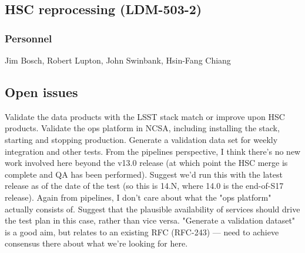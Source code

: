 \subsection{HSC reprocessing \textbf{(LDM-503-2)}\label{LDM-503-2}}
\subsubsection{Personnel}
Jim Bosch, Robert Lupton, John Swinbank, Hsin-Fang Chiang

\subsection{Open issues}
 Validate the data products with the LSST stack match or improve upon HSC products.
 Validate the ops platform in NCSA, including installing the stack, starting and stopping production.
 Generate a validation data set for weekly integration and other tests.
 \newline From the pipelines perspective, I think there's no new work involved here beyond the v13.0 release (at which point the HSC merge is complete and QA has been performed). Suggest we'd run this with the latest release as of the date of the test (so this is 14.N, where 14.0 is the end-of-S17 release).
 Again from pipelines, I don't care about what the "ops platform" actually consists of. Suggest that the plausible availability of services should drive the test plan in this case, rather than vice versa.
 "Generate a validation dataset" is a good aim, but relates to an existing RFC (RFC-243) — need to achieve consensus there about what we're looking for here.


